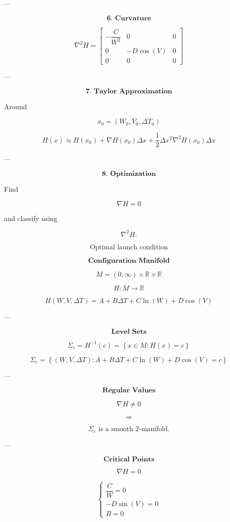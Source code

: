 \documentclass{article}
\begin{document}
---

\[
\textbf{6. Curvature}
\]

\[
\nabla^2H
=
\begin{bmatrix}
-\dfrac{C}{W^2}&0&0\\
0&-D\cos(V)&0\\
0&0&0
\end{bmatrix}
\]

---

\[
\textbf{7. Taylor Approximation}
\]

Around

\[
x_0=(W_0,V_0,\Delta T_0)
\]

\[
\boxed{
H(x)
\approx
H(x_0)
+
\nabla H(x_0)\Delta x
+
\frac12
\Delta x^T
\nabla^2H(x_0)
\Delta x
}
\]

---

\[
\textbf{8. Optimization}
\]

Find

\[
\nabla H=0
\]

and classify using

\[
\nabla^2H.
\]

\[
\boxed{
\text{Optimal launch condition}
}
\]


\[
\textbf{Configuration Manifold}
\]

\[
M=(0,\infty)\times\mathbb{R}\times\mathbb{R}
\]

\[
H:M\rightarrow\mathbb{R}
\]

\[
H(W,V,\Delta T)
=
A+B\Delta T+C\ln(W)+D\cos(V)
\]

---

\[
\textbf{Level Sets}
\]

\[
\Sigma_c
=
H^{-1}(c)
=
\left\{
x\in M:
H(x)=c
\right\}
\]

\[
\Sigma_c
=
\left\{
(W,V,\Delta T):
A+B\Delta T+C\ln(W)+D\cos(V)=c
\right\}
\]

---

\[
\textbf{Regular Values}
\]

\[
\nabla H\neq0
\]

\[
\Longrightarrow
\]

\[
\Sigma_c
\text{ is a smooth }2\text{-manifold.}
\]

---

\[
\textbf{Critical Points}
\]

\[
\nabla H=0
\]

\[
\begin{cases}
\dfrac{C}{W}=0\\[6pt]
-D\sin(V)=0\\[6pt]
B=0
\end{cases}
\]
\end{document}
